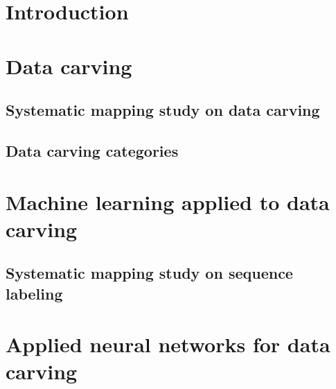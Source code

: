 \chapter{Introduction}


    
    
    

\chapter{Data carving}


    \section{Systematic mapping study on data carving}
    \label{sec:data-carving-sms}
    
    
    \section{Data carving categories}
    \label{sec:data-carving-taxonomies}
    

\chapter{Machine learning applied to data carving}


    

    \section{Systematic mapping study on sequence labeling}
    

\chapter{Applied neural networks for data carving}


